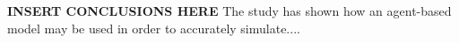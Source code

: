\textbf{INSERT CONCLUSIONS HERE}
The study has shown how an agent-based model may be used in order to accurately simulate....